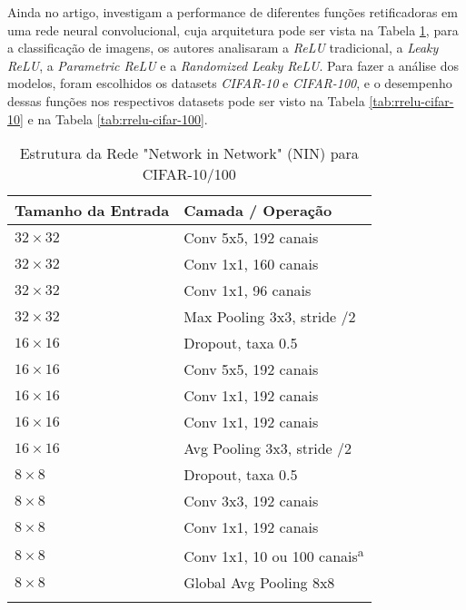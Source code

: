 Ainda no artigo, \textcite{XuRReLU} investigam a performance de diferentes funções retificadoras em uma rede neural convolucional, cuja arquitetura pode ser vista na Tabela \ref{tab:nin_arquitetura}, para a classificação de imagens, os autores analisaram a \textit{ReLU} tradicional, a \textit{Leaky ReLU}, a \textit{Parametric ReLU} e a \textit{Randomized Leaky ReLU}. Para fazer a análise dos modelos, foram escolhidos os datasets \textit{CIFAR-10} e \textit{CIFAR-100}, e o desempenho dessas funções nos respectivos datasets pode ser visto na Tabela \ref{tab:rrelu-cifar-10} e na Tabela \ref{tab:rrelu-cifar-100}.

\begin{table}[ht]
    \centering
    \begin{threeparttable}
        \caption{Estrutura da Rede "Network in Network" (NIN) para CIFAR-10/100}
        \label{tab:nin_arquitetura}
        \begin{tabular}{ll}
            \toprule
            \textbf{Tamanho da Entrada} & \textbf{Camada / Operação} \\
            \midrule
            
            $32 \times 32$ & Conv 5x5, 192 canais \\
            $32 \times 32$ & Conv 1x1, 160 canais \\
            $32 \times 32$ & Conv 1x1, 96 canais \\
            $32 \times 32$ & Max Pooling 3x3, stride /2 \\
            \addlinespace %
            
            $16 \times 16$ & Dropout, taxa 0.5 \\
            $16 \times 16$ & Conv 5x5, 192 canais \\
            $16 \times 16$ & Conv 1x1, 192 canais \\
            $16 \times 16$ & Conv 1x1, 192 canais \\
            $16 \times 16$ & Avg Pooling 3x3, stride /2 \\
            \addlinespace
            
            $8 \times 8$ & Dropout, taxa 0.5 \\
            $8 \times 8$ & Conv 3x3, 192 canais \\
            $8 \times 8$ & Conv 1x1, 192 canais \\
            $8 \times 8$ & Conv 1x1, 10 ou 100 canais\textsuperscript{a} \\
            $8 \times 8$ & Global Avg Pooling 8x8 \\
            \addlinespace
            

\end{tabular}
\end{threeparttable}
\end{table}
